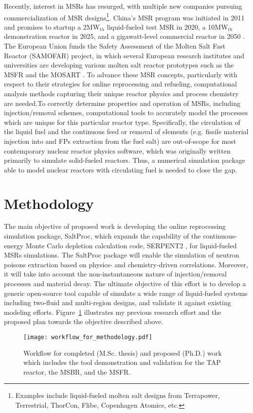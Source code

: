 Recently, interest in \glspl{MSR} has resurged, with multiple new companies 
pursuing commercialization of \gls{MSR} designs\footnote{Examples 
include liquid-fueled molten salt designs from Terrapower, Terrestrial, 
ThorCon, Flibe, Copenhagen Atomics, etc.}. China's \gls{MSR} program 
was initiated in 2011 and promises to startup a 2MW$_{th}$ 
liquid-fueled test \gls{MSR} in 2020, a 10MW$_{th}$ 
demonstration reactor in 2025, and a gigawatt-level 
commercial reactor in 2050 \cite{zhang_review_2018}. The European 
Union funds the Safety Assessment of the Molten Salt Fast Reactor 
(SAMOFAR) project, in which several European research institutes and 
universities are developing various molten salt reactor prototypes 
such as the \gls{MSFR} \cite{fiorina_molten_2013} and the \gls{MOSART} 
\cite{ignatiev_molten_2014}.
To advance these \gls{MSR} concepts, particularly with respect 
to their strategies for online reprocessing and refueling, 
computational analysis methods capturing their unique reactor physics 
and process chemistry are needed.To correctly determine properties and 
operation of \glspl{MSR}, 
including injection/removal schemes, computational tools to accurately 
model the processes which are unique for this particular reactor type. 
Specifically, the circulation of the liquid fuel and the continuous 
feed or removal of elements (e.g. fissile material injection into 
and \glspl{FP} extraction from the fuel salt) are out-of-scope for 
most contemporary nuclear reactor physics software, which was  
originally written primarily to simulate solid-fueled reactors. 
Thus, a numerical simulation package able to model 
nuclear reactors with circulating fuel is needed to close the gap.

\section{Methodology}
The main objective of proposed work is developing the online 
reprocessing simulation package, SaltProc, which expands the 
capability of the continuous-energy Monte Carlo depletion 
calculation code, SERPENT2 \cite{leppanen_serpent_2015}, for 
liquid-fueled \glspl{MSR} simulations. The SaltProc package 
will enable the simulation of neutron poisons extraction 
based on physics- and chemistry-driven correlations. 
Moreover, it will take into account the non-instantaneous 
nature of injection/removal processes and material decay. 
The ultimate objective of this effort is to develop a generic 
open-source tool capable of simulate a wide range of 
liquid-fueled systems including two-fluid and multi-region 
designs, and validate it against existing modeling efforts. 
Figure~\ref{fig:workflow_method} illustrates my previous 
research effort and the proposed plan towards the objective 
described above.
\begin{figure}[htp!] %
  \centering
	\texttt{[image: workflow\_for\_methodology.pdf]}
  \caption{Workflow for completed (M.Sc. thesis) and proposed (Ph.D.) work 
  which includes the tool demonstration and validation for the \gls{TAP} 
  reactor, the \gls{MSBR}, and the \gls{MSFR}.}
  \label{fig:workflow_method}
\end{figure}

